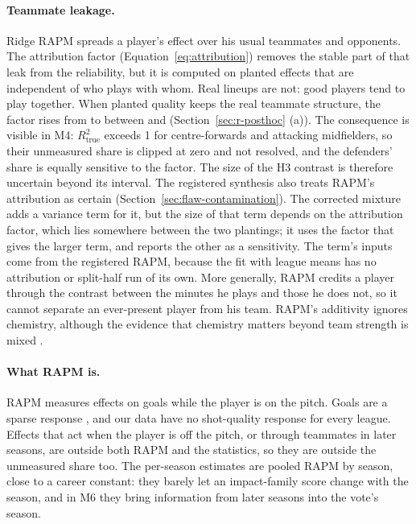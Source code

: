 \documentclass[11pt,a4paper]{article}
\begin{document}
\paragraph{Teammate leakage.}
Ridge RAPM spreads a player's effect over his usual teammates and opponents.
The attribution factor (Equation~\eqref{eq:attribution}) removes the stable
part of that leak from the reliability, but it is computed on planted effects
that are independent of who plays with whom. Real lineups are not: good players
tend to play together. When planted quality keeps the real teammate structure,
the factor rises from \AttrFullTotal{} to between \AssortAttrLo{} and
\AssortAttrHi{} (Section~\ref{sec:r-posthoc} (a)). The consequence is visible in
M4: $R^2_{\text{true}}$ exceeds 1 for centre-forwards and attacking
midfielders, so their unmeasured share is clipped at zero and not resolved,
and the defenders' share is equally sensitive to the factor. The size of the H3
contrast is therefore uncertain beyond its interval. The registered synthesis
also treats RAPM's attribution as certain
(Section~\ref{sec:flaw-contamination}). The corrected mixture adds a variance
term for it, but the size of that term depends on the attribution factor,
which lies somewhere between the two plantings; it uses the factor that gives
the larger term, and reports the other as a sensitivity. The term's inputs
come from the registered RAPM, because the fit with league means has no
attribution or split-half run of its own. More generally, RAPM credits a
player through the contrast between the minutes he plays and those he does
not, so it cannot separate an ever-present player from his team. RAPM's
additivity ignores chemistry, although the evidence that chemistry matters
beyond team strength is mixed
\citep{mukherjee2019shared,lecoz2025shared}.

\paragraph{What RAPM is.}
RAPM measures effects on goals while the player is on the pitch. Goals are a
sparse response \citep{kharrat2020plusminus}, and our data have no
shot-quality response for every league. Effects that act when the player is off
the pitch, or through teammates in later seasons, are outside both RAPM and the
statistics, so they are outside the unmeasured share too. The per-season
estimates are pooled RAPM by season, close to a career constant: they barely
let an impact-family score change with the season, and in M6 they bring
information from later seasons into the vote's season.
\end{document}

